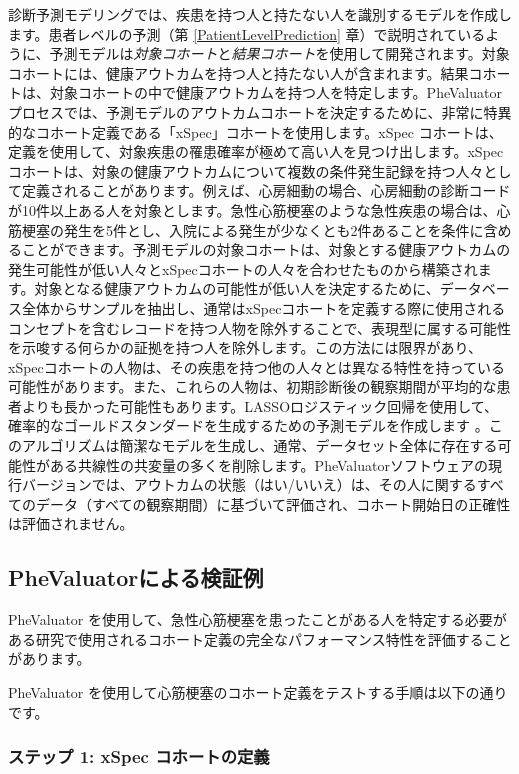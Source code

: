 \documentclass[
  11pt]{book}
\theoremstyle{definition}
\theoremstyle{definition}
\theoremstyle{definition}
\theoremstyle{definition}
\theoremstyle{remark}
\begin{document}
診断予測モデリングでは、疾患を持つ人と持たない人を識別するモデルを作成します。患者レベルの予測（第 \ref{PatientLevelPrediction} 章）で説明されているように、予測モデルは\emph{対象コホート}と\emph{結果コホート}を使用して開発されます。対象コホートには、健康アウトカムを持つ人と持たない人が含まれます。結果コホートは、対象コホートの中で健康アウトカムを持つ人を特定します。PheValuator プロセスでは、予測モデルのアウトカムコホートを決定するために、非常に特異的なコホート定義である「xSpec」コホートを使用します。xSpec コホートは、定義を使用して、対象疾患の罹患確率が極めて高い人を見つけ出します。xSpec コホートは、対象の健康アウトカムについて複数の条件発生記録を持つ人々として定義されることがあります。例えば、心房細動の場合、心房細動の診断コードが10件以上ある人を対象とします。急性心筋梗塞のような急性疾患の場合は、心筋梗塞の発生を5件とし、入院による発生が少なくとも2件あることを条件に含めることができます。予測モデルの対象コホートは、対象とする健康アウトカムの発生可能性が低い人々とxSpecコホートの人々を合わせたものから構築されます。対象となる健康アウトカムの可能性が低い人を決定するために、データベース全体からサンプルを抽出し、通常はxSpecコホートを定義する際に使用されるコンセプトを含むレコードを持つ人物を除外することで、表現型に属する可能性を示唆する何らかの証拠を持つ人を除外します。この方法には限界があり、xSpecコホートの人物は、その疾患を持つ他の人々とは異なる特性を持っている可能性があります。また、これらの人物は、初期診断後の観察期間が平均的な患者よりも長かった可能性もあります。LASSOロジスティック回帰を使用して、確率的なゴールドスタンダードを生成するための予測モデルを作成します \citep{suchard_2013} 。このアルゴリズムは簡潔なモデルを生成し、通常、データセット全体に存在する可能性がある共線性の共変量の多くを削除します。PheValuatorソフトウェアの現行バージョンでは、アウトカムの状態（はい/いいえ）は、その人に関するすべてのデータ（すべての観察期間）に基づいて評価され、コホート開始日の正確性は評価されません。

\subsection{PheValuatorによる検証例}\label{phevaluatorux306bux3088ux308bux691cux8a3cux4f8b}

PheValuator を使用して、急性心筋梗塞を患ったことがある人を特定する必要がある研究で使用されるコホート定義の完全なパフォーマンス特性を評価することがあります。

PheValuator を使用して心筋梗塞のコホート定義をテストする手順は以下の通りです。

\subsubsection*{ステップ 1: xSpec コホートの定義}\label{ux30b9ux30c6ux30c3ux30d7-1-xspec-ux30b3ux30dbux30fcux30c8ux306eux5b9aux7fa9}
\end{document}
